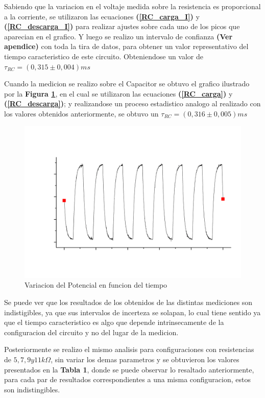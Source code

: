 \documentclass[11pt,a4paper]{article}
\begin{document}
Sabiendo que la variacion en el voltaje medida sobre la resistencia es proporcional a la corriente, se utilizaron las ecuaciones \textbf{(\ref{RC_carga_I})} y \textbf{(\ref{RC_descarga_I})} para realizar ajustes sobre cada uno de los picos que aparecian en el grafico. Y luego se realizo un intervalo de confianza \textbf{(Ver apendice)} con toda la tira de datos, para obtener un valor representativo del tiempo caracteristico de este circuito. Obteniendose un valor de  $\tau_{RC}=(0,315 \pm 0,004) ms$

Cuando la medicion se realizo sobre el Capacitor se obtuvo el grafico ilustrado por la \textbf{Figura \ref{fig:RC-CC}}, en el cual se utilizaron las ecuaciones \textbf{(\ref{RC_carga})} y \textbf{(\ref{RC_descarga})}; y realizandose un proceso estadistico analogo al realizado con los valores obtenidos anteriormente, se obtuvo un $\tau_{RC}=(0,316 \pm 0,005) ms$

\begin{figure}[H]
\centering
\includegraphics[scale=0.45]{RC-Caida_en_Capacitor}
  \caption{Variacion del Potencial en funcion del tiempo}
  \label{fig:RC-CC}
\end{figure}

Se puede ver que los resultados de los obtenidos de las distintas mediciones son indistigibles, ya que sus intervalos de incerteza se solapan, lo cual tiene sentido ya que el tiempo caracteristico es algo que depende intrinsecamente de la configuracion del circuito y no del lugar de la medicion.

Posteriormente se realizo el mismo analisis para configuraciones con resistencias de $5, 7, 9 y 11 k\Omega$, sin variar los demas parametros y se obtuvieron los valores presentados en la  \textbf{Tabla 1}, donde se puede observar lo resaltado anteriormente, para cada par de resultados correspondientes a una misma configuracion, estos son indistingibles.
\end{document}
